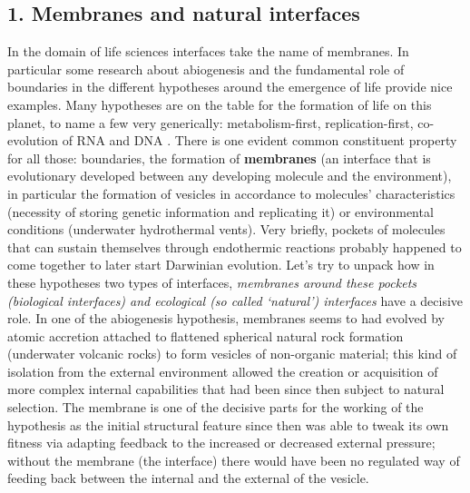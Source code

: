 \documentclass[14pt]{extarticle}
\begin{document}
\subsection*{1. Membranes and natural interfaces}
\label{subsec:membranes}
    
\hspace*{15mm}In the domain of life sciences interfaces take the name of membranes. In particular some research about abiogenesis and the fundamental role of boundaries in the different hypotheses around the emergence of life provide nice examples.
\newline
\hspace*{15mm}Many hypotheses are on the table for the formation of life on this planet, to name a few very generically: metabolism-first, replication-first, co-evolution of RNA and DNA \cite{lingam2021life}. There is one evident common constituent property for all those: boundaries, the formation of \textbf{membranes} (an interface that is evolutionary developed between any developing molecule and the environment), in particular the formation of vesicles in accordance to molecules’ characteristics (necessity of storing genetic information and replicating it) or environmental conditions (underwater hydrothermal vents). Very briefly, pockets of molecules that can sustain themselves through endothermic reactions probably happened to come together to later start Darwinian evolution.
\newline
\hspace*{15mm}Let’s try to unpack how in these hypotheses two types of interfaces, \textit{membranes around these pockets (biological interfaces) and ecological (so called ‘natural’) interfaces} have a decisive role. In one of the abiogenesis hypothesis, membranes seems to had evolved by atomic accretion attached to flattened spherical natural rock formation (underwater volcanic rocks) to form vesicles of non-organic material; this kind of isolation from the external environment allowed the creation or acquisition of more complex internal capabilities that had been since then subject to natural selection.
\newline
The membrane is one of the decisive parts for the working of the hypothesis \cite{lingam2021life} as the initial structural feature since then was able to tweak its own fitness via adapting feedback to the increased or decreased external pressure; without the membrane (the interface) there would have been no regulated way of feeding back between the internal and the external of the vesicle.
\newline
\end{document}
